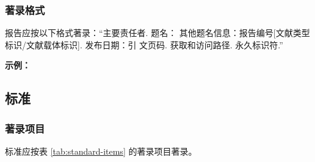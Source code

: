 \documentclass[twoside]{article}%
\begin{document}

\subsubsection{著录格式}\label{sec:report:biblieg}
报告应按以下格式著录：“主要责任者. 题名： 其他题名信息：报告编号[文献类型标识/文献载体标识]. 发布日期：引
文页码. 获取和访问路径. 永久标识符.”


\begin{refsection}

\nocite{汤万金2013-09-30--,%
中国信息2023白皮书}
\nocite{Calkin2011-8-9}
\nocite{DTFHA1990--}


\mbox{}{\small\textbf{示例：}\par}

{\printbibliography[heading=none,env=indentegenv]}
\end{refsection}


\subsection{标准}\label{sec:entrytype:standard}



\subsubsection{著录项目}
标准应按表 \ref{tab:standard-items} 的著录项目著录。
\end{document}
